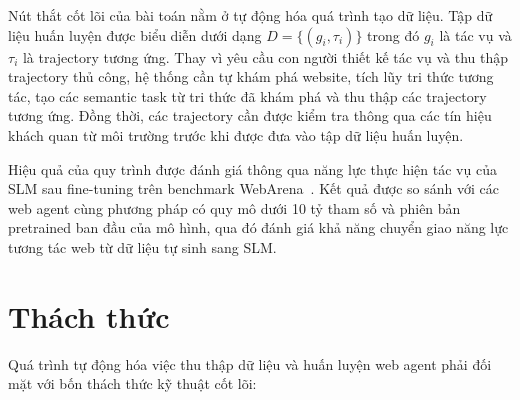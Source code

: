 Nút thắt cốt lõi của bài toán nằm ở tự động hóa quá trình tạo dữ liệu. Tập dữ liệu huấn luyện được biểu diễn dưới dạng $D = \{(g_i, \tau_i)\}$ trong đó $g_i$ là tác vụ và $\tau_i$ là trajectory tương ứng. Thay vì yêu cầu con người thiết kế tác vụ và thu thập trajectory thủ công, hệ thống cần tự khám phá website, tích lũy tri thức tương tác, tạo các semantic task từ tri thức đã khám phá và thu thập các trajectory tương ứng. Đồng thời, các trajectory cần được kiểm tra thông qua các tín hiệu khách quan từ môi trường trước khi được đưa vào tập dữ liệu huấn luyện.

Hiệu quả của quy trình được đánh giá thông qua năng lực thực hiện tác vụ của SLM sau fine-tuning trên benchmark WebArena~\cite{zhou2024webarena}. Kết quả được so sánh với các web agent cùng phương pháp có quy mô dưới 10 tỷ tham số và phiên bản pretrained ban đầu của mô hình, qua đó đánh giá khả năng chuyển giao năng lực tương tác web từ dữ liệu tự sinh sang SLM.

\section{Thách thức}
\label{sec:intro-challenges}

Quá trình tự động hóa việc thu thập dữ liệu và huấn luyện web agent phải đối mặt với bốn thách thức kỹ thuật cốt lõi:

